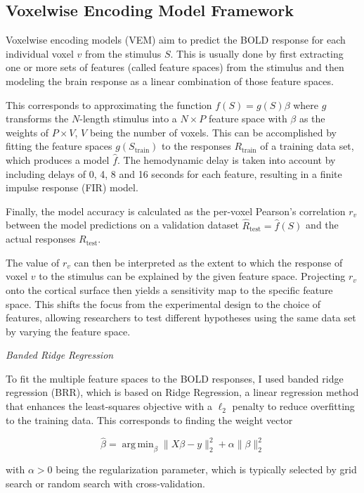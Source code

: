 \documentclass[a4paper]{article}
\DeclareMathOperator*{\argmin}{arg\,min}
\begin{document}
\subsection*{Voxelwise Encoding Model Framework}
Voxelwise encoding models (VEM) aim to predict the BOLD response for each individual voxel $v$ from the stimulus $S$. This is usually done by first extracting one or more sets of features (called feature spaces) from the stimulus and then modeling the brain response as a linear combination of those feature spaces.

This corresponds to approximating the function $f(S) = g(S)\beta$ where $g$ transforms the $N$-length stimulus into a $N\times P$ feature space with $\beta$ as the weights of $P\times V$, $V$ being the number of voxels. This can be accomplished by fitting the feature spaces $g(S_{\text{train}})$ to the responses $R_{\text{train}}$ of a training data set, which produces a model $\hat{f}$. The hemodynamic delay is taken into account by including delays of 0, 4, 8 and 16 seconds for each feature, resulting in a finite impulse response (FIR) model.
 
Finally, the model accuracy is calculated as the per-voxel Pearson's correlation $r_v$ between the model predictions on a validation dataset $\hat{R}_{\text{test}} = \hat{f}(S)$ and the actual responses $R_{\text{test}}$.
 
The value of $r_v$ can then be interpreted as the extent to which the response of voxel $v$ to the stimulus can be explained by the given feature space. Projecting $r_v$ onto the cortical surface then yields a sensitivity map to the specific feature space. This shifts the focus from the experimental design to the choice of features, allowing researchers to test different hypotheses using the same data set by varying the feature space.
 
\textit{Banded Ridge Regression}
 
To fit the multiple feature spaces to the BOLD responses, I used banded ridge regression (BRR), which is based on Ridge Regression, a linear regression method that enhances the least-squares objective with a $\ell_2$ penalty to reduce overfitting to the training data. This corresponds to finding the weight vector
 
\begin{equation*}
    \hat{\beta} = \argmin_{\beta} \lVert X\beta - y \rVert^2_2 + \alpha \lVert \beta \rVert^2_2
\end{equation*}
 
with $\alpha > 0$ being the regularization parameter, which is typically selected by grid search or random search with cross-validation.
 
\end{document}
